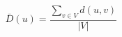 \documentclass[12pt]{article}
\begin{document}
\[
\bar{D}\left(u\right) =
    \frac{\sum_{v \in V}{d\left(u,v\right)}}{\left|V\right|}
\]
\end{document}

